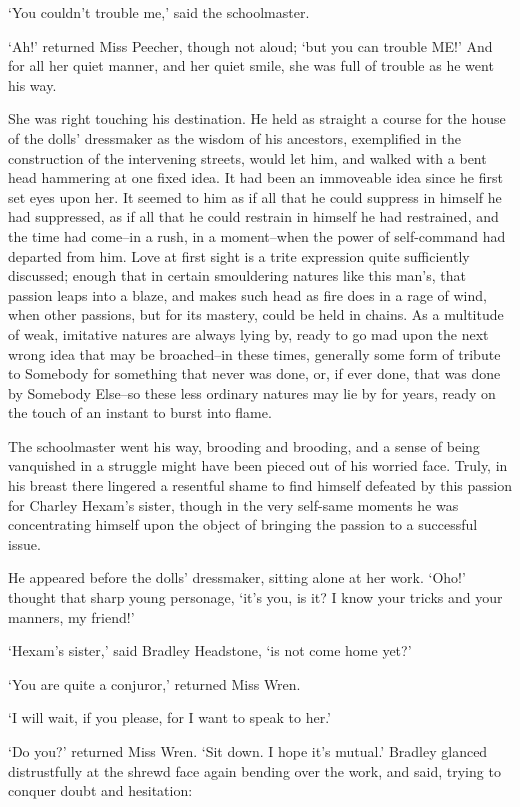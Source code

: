 ‘You couldn’t trouble me,’ said the schoolmaster.

‘Ah!’ returned Miss Peecher, though not aloud; ‘but you can trouble
ME!’ And for all her quiet manner, and her quiet smile, she was full of
trouble as he went his way.

She was right touching his destination. He held as straight a course
for the house of the dolls’ dressmaker as the wisdom of his ancestors,
exemplified in the construction of the intervening streets, would let
him, and walked with a bent head hammering at one fixed idea. It had
been an immoveable idea since he first set eyes upon her. It seemed to
him as if all that he could suppress in himself he had suppressed, as
if all that he could restrain in himself he had restrained, and the time
had come--in a rush, in a moment--when the power of self-command had
departed from him. Love at first sight is a trite expression quite
sufficiently discussed; enough that in certain smouldering natures like
this man’s, that passion leaps into a blaze, and makes such head as fire
does in a rage of wind, when other passions, but for its mastery, could
be held in chains. As a multitude of weak, imitative natures are
always lying by, ready to go mad upon the next wrong idea that may be
broached--in these times, generally some form of tribute to Somebody
for something that never was done, or, if ever done, that was done by
Somebody Else--so these less ordinary natures may lie by for years,
ready on the touch of an instant to burst into flame.

The schoolmaster went his way, brooding and brooding, and a sense of
being vanquished in a struggle might have been pieced out of his worried
face. Truly, in his breast there lingered a resentful shame to find
himself defeated by this passion for Charley Hexam’s sister, though in
the very self-same moments he was concentrating himself upon the object
of bringing the passion to a successful issue.

He appeared before the dolls’ dressmaker, sitting alone at her work.
‘Oho!’ thought that sharp young personage, ‘it’s you, is it? I know your
tricks and your manners, my friend!’

‘Hexam’s sister,’ said Bradley Headstone, ‘is not come home yet?’

‘You are quite a conjuror,’ returned Miss Wren.

‘I will wait, if you please, for I want to speak to her.’

‘Do you?’ returned Miss Wren. ‘Sit down. I hope it’s mutual.’ Bradley
glanced distrustfully at the shrewd face again bending over the work,
and said, trying to conquer doubt and hesitation:

